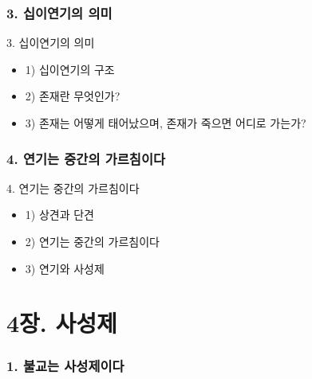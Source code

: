 \documentclass[aspectratio=1610,14pt,xcolor=pdftex,dvipsnames,table,handout]{beamer}
\begin{document}
		\section{3. 십이연기의 의미}
		\frame [plain] {\sectionpage}

		\begin{frame} [t,plain]
			\begin{block} {3. 십이연기의 의미}
			\begin{itemize}
				\item 1) 십이연기의 구조
				\item 2) 존재란 무엇인가?
				\item 3) 존재는 어떻게 태어났으며, 존재가 죽으면 어디로 가는가?
			\end{itemize}
			\end{block}
		\end{frame}

		\section{4. 연기는 중간의 가르침이다}
		\frame [plain] {\sectionpage}


		\begin{frame} [t,plain]
			\begin{block} {4. 연기는 중간의 가르침이다}
			\begin{itemize}
				\item 1) 상견과 단견
				\item 2) 연기는 중간의 가르침이다
				\item 3) 연기와 사성제
			\end{itemize}
			\end{block}
		\end{frame}

		\part{4장. 사성제}
		\frame{\partpage}



		\section{1. 불교는 사성제이다}
		\frame [plain] {\sectionpage}
\end{document}
